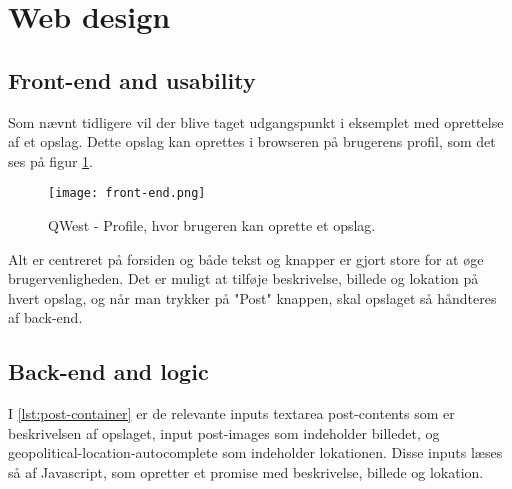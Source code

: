 \section{Web design}\label{sec:webdesign}
\subsection{Front-end and usability}\label{sec:frontend}
Som nævnt tidligere vil der blive taget udgangspunkt i eksemplet med oprettelse af et opslag. Dette opslag kan oprettes i browseren på brugerens profil, som det ses på figur \ref{fig:frontend}.

\begin{figure}
    \texttt{[image: front-end.png]}
    \caption{QWest - Profile, hvor brugeren kan oprette et opslag.}
    \label{fig:frontend}
\end{figure}

Alt er centreret på forsiden og både tekst og knapper er gjort store for at øge brugervenligheden. Det er muligt at tilføje beskrivelse, billede og lokation på hvert opslag, og når man trykker på "Post" knappen, skal opslaget så håndteres af back-end. 

\subsection{Back-end and logic}\label{sec:backend}


I \ref{lst:post-container} er de relevante inputs textarea post-contents som er beskrivelsen af opslaget, input post-images som indeholder billedet, og geopolitical-location-autocomplete som indeholder lokationen. 
Disse inputs læses så af Javascript, som opretter et promise med beskrivelse, billede og lokation.

